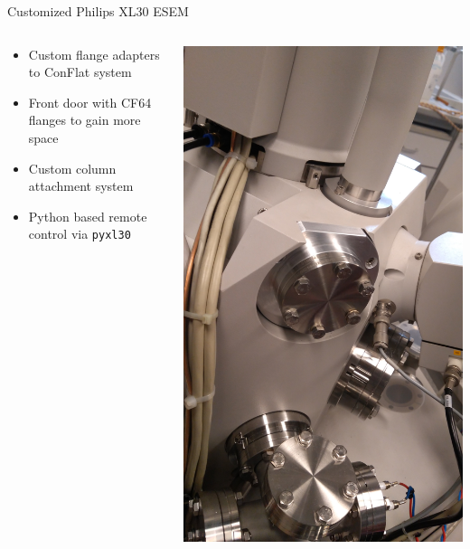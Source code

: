 \documentclass[final]{beamer}
\begin{document}
\begin{frame}[fragile]{}
\begin{columns}[T]
\begin{column}{.49\linewidth}
\begin{block}{\Large Customized Philips XL30 ESEM}
\begin{columns}
\begin{column}{0.225\columnwidth}
\begin{itemize}
					\item Custom flange adapters to ConFlat system
					\item Front door with CF64 flanges to gain more space
					\item Custom column attachment system
					\item Python based remote control via \texttt{pyxl30}
				\end{itemize}
			\end{column}
			\begin{column}{0.225\columnwidth}
				\includegraphics[width=\columnwidth]{./figures/flanges02.jpg}

\end{column}
\end{columns}
\end{block}
\end{column}
\end{columns}
\end{frame}
\end{document}
